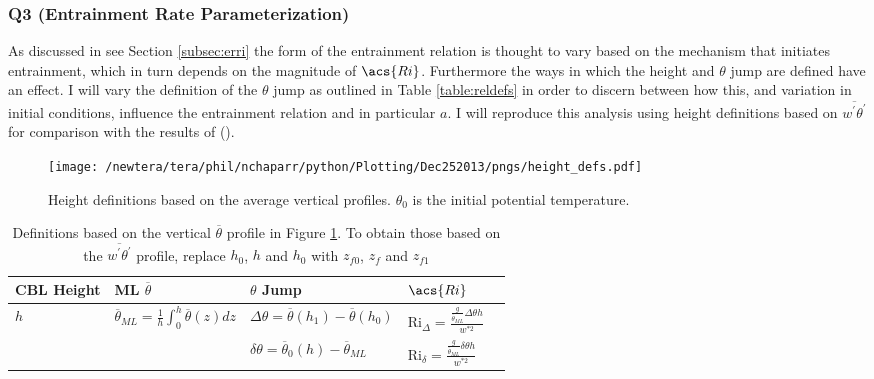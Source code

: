 \subsubsection{Q3 (Entrainment Rate Parameterization)}
As discussed in see Section \ref{subsec:erri} the form of the entrainment relation is thought to vary based on the mechanism that initiates entrainment, which in turn depends on the magnitude of $\acs{Ri}$.  Furthermore the ways in which the height and $\theta$ jump are defined have an effect. I will vary the definition of the $\theta$ jump as outlined in Table \ref{table:reldefs} in order to discern between how this, and variation in initial conditions, influence the entrainment relation and in particular $a$. I will reproduce this analysis using height definitions based on $\overline{w^{'}\theta^{'}}$ for comparison with the results of \citeauthor{FedConzMir04} (\citeyear{FedConzMir04}).

\begin{figure}[htbp]
    \centering
    \texttt{[image: /newtera/tera/phil/nchaparr/python/Plotting/Dec252013/pngs/height\_defs.pdf]}
    \caption[Height definitions]{Height definitions based on the average vertical profiles. $\theta_{0}$ is the initial potential temperature.}
    \label{fig:hdefs}   %
\end{figure}

\begin{table}[htbp]
\caption[Height definitions]{Definitions based on the vertical $\overline{\theta}$ profile in Figure \ref{fig:hdefs}.  To obtain those based on the $\overline{w^{'}\theta^{'}}$ profile, replace $h_{0}$, $h$ and $h_{0}$ with $z_{f0}$, $z_{f}$ and $z_{f1}$}
    \begin{center}
    \begin{tabular}{ p{1.2cm} p{3.3cm}  p{3.2cm}  p{3cm} p{2.5cm} }
      \acs{CBL} Height & \acs{ML} $\overline{\theta}$ & $\theta$ Jump &$\acs{Ri}$\\ \hline 
       $h$ & $\overline{\theta}_{ML} = \frac{1}{h}\int^{h}_{0}\overline{\theta}(z)dz$ & $\Delta \theta=\overline{\theta}(h_{1})-\overline{\theta}(h_{0})$ & \acs{Ri}$_{\Delta}=\frac{\frac{g}{\overline{\theta}_{ML}}\Delta \theta h}{w^{*2}}$  \\ [.3cm] %
        
       & &$\delta \theta = \overline{\theta}_{0}(h)- \overline{\theta}_{ML}$ & \acs{Ri}$_{\delta}=\frac{\frac{g}{\overline{\theta}_{ML}} \delta \theta h}{w^{*2}}$ \\ \hline
      \end{tabular}
\label{tab:reldefs}   
\end{center}    
\end{table}

